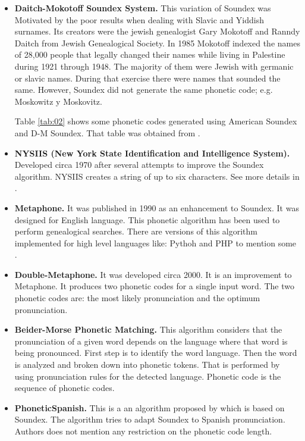 \documentclass[9pt,conference]{IEEEtran}
\begin{document}
\begin{itemize}
\item \textbf{Daitch-Mokotoff Soundex System.}
This variation of Soundex was Motivated by the poor results when dealing with Slavic and Yiddish 
surnames. Its creators were the jewish genealogist Gary Mokotoff and Ranndy Daitch from Jewish 
Genealogical Society. In 1985 Mokotoff indexed the names of 28,000 people that legally changed 
their names while living in Palestine during 1921 through 1948. The majority of them were Jewish 
with germanic or slavic names. During that exercise there were names that sounded the same. 
However, Soundex did not generate the same phonetic code; e.g. Moskowitz y Moskovitz\cite{ref:08}\cite{ref:32}\cite{ref:24}.
	
Table \ref{tab:02} shows some phonetic codes generated using American Soundex and D-M 
Soundex. That table was obtained from \cite{ref:39}.







\item \textbf{NYSIIS (New York State Identification and Intelligence System).}
Developed circa 1970 after several attempts to improve the Soundex algorithm. NYSIIS creates a 
string of up to six characters. See more details in \cite{ref:17}\cite{ref:24}.\\


\item \textbf{Metaphone.}
It was published in 1990 as an enhancement to Soundex. It was designed for English language.
This phonetic algorithm has been used to perform genealogical searches. There are versions of
this algorithm implemented for high level languages like: Pythoh and PHP to mention some
\cite{ref:11,ref:13,ref:22,ref:24}.\\


\item \textbf{Double-Metaphone.}
It was developed circa 2000. It is an improvement to Metaphone. It produces two phonetic codes 
for a single input word. The two phonetic codes are: the most likely pronunciation and the optimum 
pronunciation\cite{ref:17}\cite{ref:24}.\\


\item \textbf{Beider-Morse Phonetic Matching.} 
This algorithm considers that the pronunciation of a given word depends on the language
where that word is being pronounced. First step is to identify the word language. Then
the word is analyzed and broken down into phonetic tokens. That is performed by using
pronunciation rules for the detected language. Phonetic code is the sequence of phonetic
codes\cite{ref:19,ref:24}.\\


\item \textbf{PhoneticSpanish.}
This is a an algorithm proposed by\cite{ref:09} which is based on Soundex. The algorithm
tries to adapt Soundex to Spanish pronunciation. Authors does not mention any restriction
on the phonetic code length.\\
\end{itemize}
\end{document}
